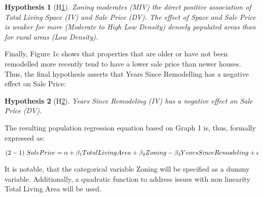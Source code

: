 \documentclass[a4paper]{article}
\newtheorem{hyp}{Hypothesis}
\begin{document}
\begin{hyp}[H\ref{hyp:second}] \label{hyp:second}
Zoning moderates (MIV) the direct positive association of Total Living Space (IV) and Sale Price (DV). The effect of Space and Sale Price is weaker for more (Moderate to High Low Density) densely populated areas than for rural areas (Low Density). 
\end{hyp}

\begin{center}
\end{center}

\indent Finally, Figure 1c shows that properties that are older or have not been remodelled more recently tend to have a lower sale price than newer houses. Thus, the final hypothesis asserts that Years Since Remodelling has a negative effect on Sale Price:



\begin{hyp}[H\ref{hyp:third}] \label{hyp:third}
Years Since Remodeling (IV) has a negative effect on Sale Price (DV).
\end{hyp}

\begin{center}
\end{center}

The resulting population regression equation based on Graph 1 is, thus, formally expressed as:



$$ (2-1)   \\\   {SalePrice} = \alpha + \beta_{1} Total Living Area
 + \beta_{2}  Zoning - \beta_{3}  Years Since Remodeling +\epsilon$$

It is notable, that the categorical variable Zoning will be specified as a dummy variable. Additionally,  a quadratic function to address issues with non linearity Total Living Area will be used. 
\end{document}
